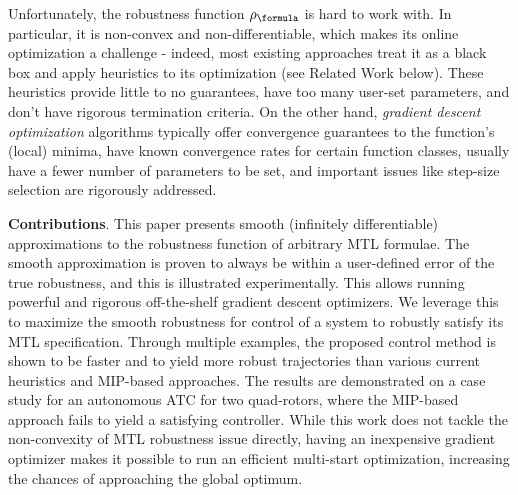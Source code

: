 Unfortunately, the robustness function $\robf$ is hard to work with.
In particular, it is non-convex and non-differentiable, which makes its online optimization a challenge - indeed, most existing approaches treat it as a black box and apply heuristics to its optimization (see Related Work below).
These heuristics provide little to no guarantees, have too many user-set parameters, and don't have rigorous termination criteria.
On the other hand, \textit{gradient descent optimization} algorithms typically offer convergence guarantees to the function's (local) minima, have known convergence rates for certain function classes, usually have a fewer number of parameters to be set, and important issues like step-size selection are rigorously addressed.

\noindent \textbf{Contributions}. This paper presents smooth (infinitely differentiable) approximations to the robustness function of arbitrary MTL formulae.
The smooth approximation is proven to always be within a user-defined error of the true robustness, and this is illustrated experimentally.
This allows running powerful and rigorous off-the-shelf gradient descent optimizers.
We leverage this to maximize the smooth robustness for control of a system to robustly satisfy its MTL specification.
Through multiple examples, the proposed control method is shown to be faster and to yield more robust trajectories than various current heuristics and MIP-based approaches. 
The results are demonstrated on a case study for an autonomous ATC for two quad-rotors, where the MIP-based approach fails to yield a satisfying controller.
While this work does not tackle the non-convexity of MTL robustness issue directly, having an inexpensive gradient optimizer makes it possible to run an efficient multi-start optimization, increasing the chances of approaching the global optimum.

